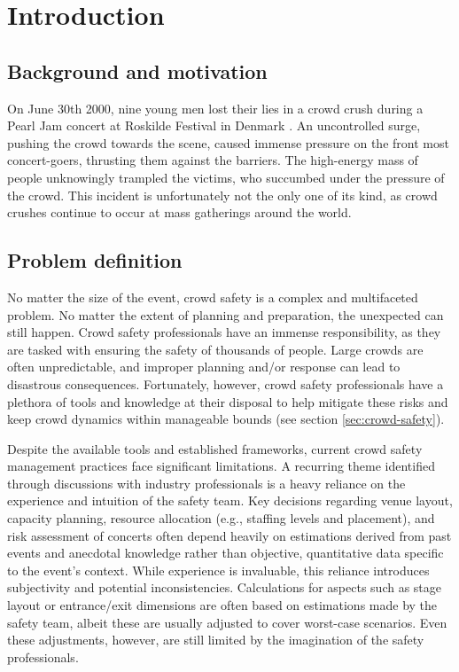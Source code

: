 \chapter{Introduction}

\section{Background and motivation}
On June 30th 2000, nine young men lost their lies in a crowd crush during a Pearl Jam concert at Roskilde Festival in Denmark \cite{pearl_jam}. An uncontrolled surge, pushing the crowd towards the scene, caused immense pressure on the front most concert-goers, thrusting them against the barriers. The high-energy mass of people unknowingly trampled the victims, who succumbed under the pressure of the crowd. This incident is unfortunately not the only one of its kind, as crowd crushes continue to occur at mass gatherings around the world.

\section{Problem definition}
\label{sec:problem-definition}

No matter the size of the event, crowd safety is a complex and multifaceted problem. No matter the extent of planning and preparation, the unexpected can still happen. Crowd safety professionals have an immense responsibility, as they are tasked with ensuring the safety of thousands of people. Large crowds are often unpredictable, and improper planning and/or response can lead to disastrous consequences. Fortunately, however, crowd safety professionals have a plethora of tools and knowledge at their disposal to help mitigate these risks and keep crowd dynamics within manageable bounds (see section \ref{sec:crowd-safety}).

Despite the available tools and established frameworks, current crowd safety management practices face significant limitations. A recurring theme identified through discussions with industry professionals is a heavy reliance on the experience and intuition of the safety team. Key decisions regarding venue layout, capacity planning, resource allocation (e.g., staffing levels and placement), and risk assessment of concerts often depend heavily on estimations derived from past events and anecdotal knowledge rather than objective, quantitative data specific to the event's context. While experience is invaluable, this reliance introduces subjectivity and potential inconsistencies. Calculations for aspects such as stage layout or entrance/exit dimensions are often based on estimations made by the safety team, albeit these are usually adjusted to cover worst-case scenarios. Even these adjustments, however, are still limited by the imagination of the safety professionals.

